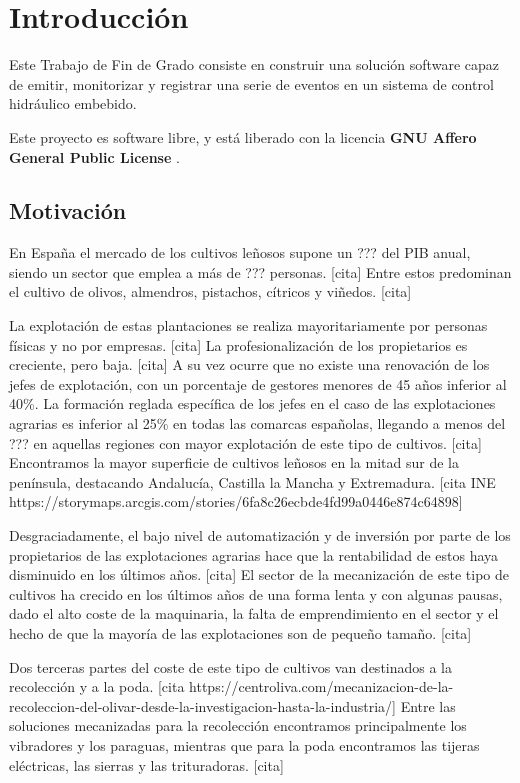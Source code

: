 \chapter{Introducción}

Este Trabajo de Fin de Grado consiste en construir una solución software
capaz de emitir, monitorizar y registrar una serie de eventos en un
sistema de control hidráulico embebido. 

Este proyecto es software libre, y está liberado con
la licencia \textbf{GNU Affero General Public License} \cite{agplv3}.

\section{Motivación}

En España el mercado de los cultivos leñosos supone un ??? del PIB
anual, siendo un sector que emplea a más de ??? personas. [cita] Entre estos
predominan el cultivo de olivos, almendros, pistachos, cítricos y
viñedos. [cita] 

La explotación de estas plantaciones se realiza mayoritariamente por personas
físicas y no por empresas. [cita] La profesionalización de los propietarios
es creciente, pero baja. [cita] A su vez ocurre que no existe una renovación
de los jefes de explotación, con un porcentaje de gestores menores de 45 años
inferior al 40\%. La formación reglada específica de los jefes en el caso de
las explotaciones agrarias es inferior al 25\% en todas las comarcas españolas,
llegando a menos del ??? en aquellas regiones con mayor
explotación de este tipo de cultivos. [cita] Encontramos la mayor superficie
de cultivos leñosos en la mitad sur de la península, destacando Andalucía,
Castilla la Mancha y Extremadura. [cita INE https://storymaps.arcgis.com/stories/6fa8c26ecbde4fd99a0446e874c64898]

Desgraciadamente, el bajo nivel de automatización y de inversión por parte
de los propietarios de las explotaciones agrarias hace que la rentabilidad
de estos haya disminuido en los últimos años. [cita]
El sector de la
mecanización de este tipo de cultivos ha crecido en los últimos años de una
forma lenta y con algunas pausas, dado el alto coste de la maquinaria, la
falta de emprendimiento en el sector y el hecho de que la mayoría de las
explotaciones son de pequeño tamaño. [cita] 

Dos terceras partes del
coste de este tipo de cultivos van destinados a la recolección y a la poda.
[cita https://centroliva.com/mecanizacion-de-la-recoleccion-del-olivar-desde-la-investigacion-hasta-la-industria/]
Entre las soluciones mecanizadas
para la recolección encontramos principalmente los vibradores y los paraguas,
mientras que para la poda encontramos las tijeras eléctricas, las sierras y
las trituradoras. [cita]

